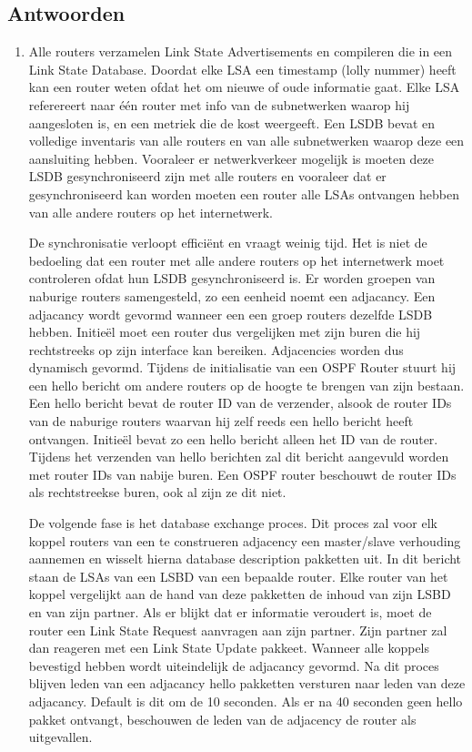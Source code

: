 \documentclass{report}
\begin{document}
\subsection{Antwoorden}
\begin{enumerate}
	\item Alle routers verzamelen Link State Advertisements en compileren die in een Link State Database. Doordat elke LSA een timestamp (lolly nummer) heeft kan een router weten ofdat het om nieuwe of oude informatie gaat. Elke LSA referereert naar één router met info van de subnetwerken waarop hij aangesloten is, en een metriek die de kost weergeeft. Een LSDB bevat en volledige inventaris van alle routers en van alle subnetwerken waarop deze een aansluiting hebben. Vooraleer er netwerkverkeer mogelijk is moeten deze LSDB gesynchroniseerd zijn met alle routers en vooraleer dat er gesynchroniseerd kan worden moeten een router alle LSAs ontvangen hebben van alle andere routers op het internetwerk.
	
De synchronisatie verloopt efficiënt en vraagt weinig tijd. Het is niet de bedoeling dat een router met alle andere routers op het internetwerk moet controleren ofdat hun LSDB gesynchroniseerd is. Er worden groepen van naburige routers samengesteld, zo een eenheid noemt een adjacancy. Een adjacancy wordt gevormd wanneer een een groep routers dezelfde LSDB hebben. Initieël moet een router dus vergelijken met zijn buren die hij rechtstreeks op zijn interface kan bereiken. Adjacencies worden dus dynamisch gevormd. Tijdens de initialisatie van een OSPF Router stuurt hij een hello bericht om andere routers op de hoogte te brengen van zijn bestaan. Een hello bericht bevat de router ID van de verzender, alsook de router IDs van de naburige routers waarvan hij zelf reeds een hello bericht heeft ontvangen. Initieël bevat zo een hello bericht alleen het ID van de router. Tijdens het verzenden van hello berichten zal dit bericht aangevuld worden met router IDs van nabije buren. Een OSPF router beschouwt de router IDs als rechtstreekse buren, ook al zijn ze dit niet. 

De volgende fase is het database exchange proces. Dit proces zal voor elk koppel routers van een te construeren adjacency een master/slave verhouding aannemen en wisselt hierna database description pakketten uit. In dit bericht staan de LSAs van een LSBD van een bepaalde router. Elke router van het koppel vergelijkt aan de hand van deze pakketten de inhoud van zijn LSBD en van zijn partner. Als er blijkt dat er informatie veroudert is, moet de router een Link State Request aanvragen aan zijn partner. Zijn partner zal dan reageren met een Link State Update pakkeet. Wanneer alle koppels bevestigd hebben wordt uiteindelijk de adjacancy gevormd. Na dit proces blijven leden van een adjacancy hello pakketten versturen naar leden van deze adjacancy. Default is dit om de 10 seconden. Als er na 40 seconden geen hello pakket ontvangt, beschouwen de leden van de adjacency de router als uitgevallen.


\end{enumerate}
\end{document}
